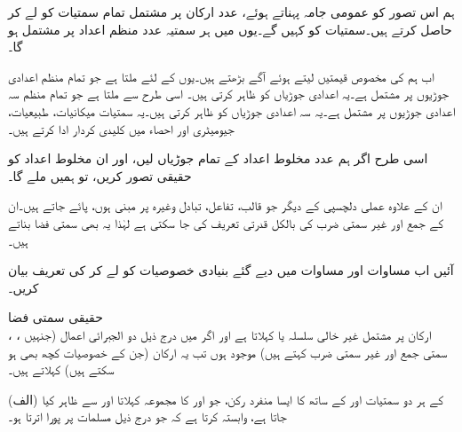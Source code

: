 ہم اس تصور کو عمومی جامہ پہناتے ہوئے،  عدد ارکان پر مشتمل تمام سمتیات کو لے کر   حاصل کرتے ہیں۔سمتیات کو  کہیں گے۔یوں  میں ہر سمتیہ  عدد منظم اعداد پر مشتمل ہو گا۔

اب ہم  کی مخصوص قیمتیں لیتے ہوئے آگے بڑھتے ہیں۔یوں  کے لئے  ملتا ہے جو تمام منظم اعدادی جوڑیوں پر مشتمل ہے۔یہ اعدادی جوڑیاں  کو ظاہر کرتی ہیں۔ اسی طرح  سے  ملتا ہے جو  تمام منظم سہ اعدادی جوڑیوں پر مشتمل ہے۔یہ سہ اعدادی جوڑیاں  کو ظاہر کرتی ہیں۔یہ سمتیات میکانیات، طبیعیات، جیومیٹری اور احصاء میں کلیدی کردار ادا کرتے ہیں۔

اسی طرح اگر ہم   عدد مخلوط اعداد کے تمام جوڑیاں لیں، اور ان مخلوط اعداد کو حقیقی تصور کریں، تو ہمیں   ملے گا۔ 

ان کے علاوہ عملی دلچسپی کے دیگر   جو قالب، تفاعل، تبادل وغیرہ پر مبنی ہوں، پائے جاتے ہیں۔ان کے جمع اور غیر سمتی ضرب کی بالکل قدرتی تعریف کی جا سکتی ہے لہٰذا یہ بھی سمتی فضا بناتے ہیں۔     

آئیں اب مساوات  اور مساوات  میں دیے گئے  بنیادی خصوصیات کو لے کر   کی تعریف بیان کریں۔

\quad حقیقی سمتی فضا\\
، ،  ارکان پر مشتمل غیر خالی سلسلہ   یا  کہلاتا ہے اور اگر  میں درج ذیل دو الجبرائی اعمال (جنہیں سمتی جمع اور غیر سمتی ضرب کہتے ہیں) موجود ہوں تب یہ ارکان (جن کے خصوصیات کچھ بھی ہو سکتے ہیں)   کہلاتے ہیں۔

(الف)\quad {}  کے ہر دو سمتیات  اور  کے ساتھ  کا ایسا منفرد رکن، جو  اور  کا مجموعہ کہلاتا  اور  سے ظاہر کیا جاتا ہے،  وابستہ  کرتا ہے کہ جو درج ذیل مسلمات پر پورا اترتا ہو۔

